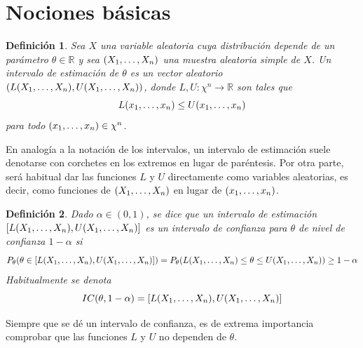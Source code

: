 \documentclass[11pt]{report}
\newtheorem{definition}{Definición}
\theoremstyle{definition}
\newcommand{\R}{\mathbb R}
\begin{document}
\section{Nociones básicas}

\begin{definition}
Sea $X$ una variable aleatoria cuya distribución depende de un parámetro $\theta \in \R$ y sea $(X_1,\mathellipsis,X_n)$ una muestra aleatoria simple de $X$. Un \emph{intervalo de estimación de $\theta$} es un vector aleatorio $(L(X_1,\mathellipsis,X_n),U(X_1,\mathellipsis,X_n))$, donde $L,U \colon \chi^n \to \R$ son tales que
\[L(x_1,\mathellipsis,x_n) \leq U(x_1,\mathellipsis,x_n)\]
para todo $(x_1,\mathellipsis,x_n) \in \chi^n$.
\end{definition}

En analogía a la notación de los intervalos, un intervalo de estimación suele denotarse con corchetes en los extremos en lugar de paréntesis. Por otra parte, será habitual dar las funciones $L$ y $U$ directamente como variables aleatorias, es decir, como funciones de $(X_1,\mathellipsis,X_n)$ en lugar de $(x_1,\mathellipsis,x_n)$.

\begin{definition}
Dado $\alpha \in (0,1)$, se dice que un intervalo de estimación $[L(X_1,\mathellipsis,X_n),U(X_1,\mathellipsis,X_n)]$ es un \emph{intervalo de confianza para $\theta$ de nivel de confianza $1-\alpha$} si
\[P_\theta(\theta \in [L(X_1,\mathellipsis,X_n),U(X_1,\mathellipsis,X_n)]) = P_\theta(L(X_1,\mathellipsis,X_n) \leq \theta \leq U(X_1,\mathellipsis,X_n)) \geq 1-\alpha\]
Habitualmente se denota
\[IC(\theta,1-\alpha) =[L(X_1,\mathellipsis,X_n),U(X_1,\mathellipsis,X_n)] \]
\end{definition}

Siempre que se dé un intervalo de confianza, es de extrema importancia comprobar que las funciones $L$ y $U$ no dependen de $\theta$.
\end{document}
